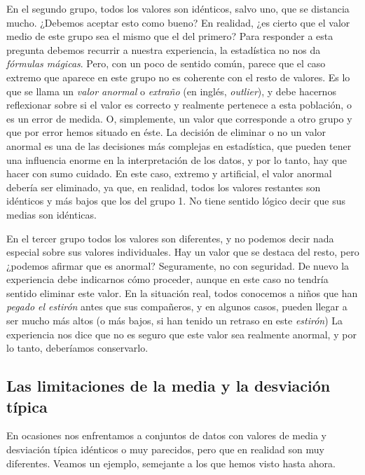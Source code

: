\documentclass[
  letterpaper,
]{scrbook}
\begin{document}
En el segundo grupo, todos los valores son idénticos, salvo uno, que se
distancia mucho. ¿Debemos aceptar esto como bueno? En realidad, ¿es
cierto que el valor medio de este grupo sea el mismo que el del primero?
Para responder a esta pregunta debemos recurrir a nuestra experiencia,
la estadística no nos da \emph{fórmulas mágicas}. Pero, con un poco de
sentido común, parece que el caso extremo que aparece en este grupo no
es coherente con el resto de valores. Es lo que se llama un \emph{valor
anormal} o \emph{extraño} (en inglés, \emph{outlier}), y debe hacernos
reflexionar sobre si el valor es correcto y realmente pertenece a esta
población, o es un error de medida. O, simplemente, un valor que
corresponde a otro grupo y que por error hemos situado en éste. La
decisión de eliminar o no un valor anormal es una de las decisiones más
complejas en estadística, que pueden tener una influencia enorme en la
interpretación de los datos, y por lo tanto, hay que hacer con sumo
cuidado. En este caso, extremo y artificial, el valor anormal debería
ser eliminado, ya que, en realidad, todos los valores restantes son
idénticos y más bajos que los del grupo 1. No tiene sentido lógico decir
que sus medias son idénticas.

En el tercer grupo todos los valores son diferentes, y no podemos decir
nada especial sobre sus valores individuales. Hay un valor que se
destaca del resto, pero ¿podemos afirmar que es anormal? Seguramente, no
con seguridad. De nuevo la experiencia debe indicarnos cómo proceder,
aunque en este caso no tendría sentido eliminar este valor. En la
situación real, todos conocemos a niños que han \emph{pegado el estirón}
antes que sus compañeros, y en algunos casos, pueden llegar a ser mucho
más altos (o más bajos, si han tenido un retraso en este \emph{estirón})
La experiencia nos dice que no es seguro que este valor sea realmente
anormal, y por lo tanto, deberíamos conservarlo.

\hypertarget{las-limitaciones-de-la-media-y-la-desviaciuxf3n-tuxedpica}{%
\subsection{Las limitaciones de la media y la desviación
típica}\label{las-limitaciones-de-la-media-y-la-desviaciuxf3n-tuxedpica}}

En ocasiones nos enfrentamos a conjuntos de datos con valores de media y
desviación típica idénticos o muy parecidos, pero que en realidad son
muy diferentes. Veamos un ejemplo, semejante a los que hemos visto hasta
ahora.
\end{document}
